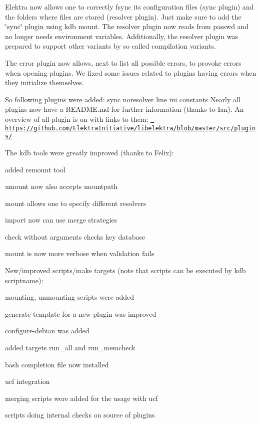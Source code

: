 Elektra now allows one to correctly fsync its configuration files (sync plugin) and the folders where files are stored (resolver plugin). Just make sure to add the \char`\"{}sync\char`\"{} plugin using kdb mount. The resolver plugin now reads from passwd and no longer needs environment variables. Additionally, the resolver plugin was prepared to support other variants by so called compilation variants.

The error plugin now allows, next to list all possible errors, to provoke errors when opening plugins. We fixed some issues related to plugins having errors when they initialize themselves.

So following plugins were added\+: sync noresolver line ini constants Nearly all plugins now have a R\+E\+A\+D\+M\+E.\+md for further information (thanks to Ian). An overview of all plugin is on with links to them\+: \href{https://github.com/ElektraInitiative/libelektra/blob/master/src/plugins/}{\texttt{ https\+://github.\+com/\+Elektra\+Initiative/libelektra/blob/master/src/plugins/}}

The kdb tools were greatly improved (thanks to Felix)\+:


\begin{DoxyItemize}
\item added remount tool
\item umount now also accepts mountpath
\item mount allows one to specify different resolvers
\item import now can use merge strategies
\item check without arguments checks key database
\item mount is now more verbose when validation fails
\end{DoxyItemize}

New/improved scripts/make targets (note that scripts can be executed by kdb scriptname)\+:


\begin{DoxyItemize}
\item mounting, unmounting scripts were added
\item generate template for a new plugin was improved
\item configure-\/debian was added
\item added targets {\ttfamily run\+\_\+all} and {\ttfamily run\+\_\+memcheck}
\item bash completion file now installed
\item ucf integration
\item merging scripts were added for the usage with ucf
\item scripts doing internal checks on source of plugins
\end{DoxyItemize}

